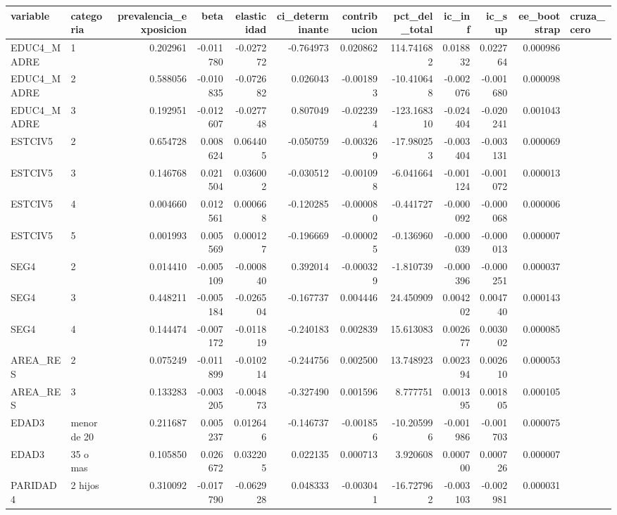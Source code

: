 \begin{tabular}{llrrrrrrrrrl}
\toprule
variable & categoria & prevalencia\_exposicion & beta & elasticidad & ci\_determinante & contribucion & pct\_del\_total & ic\_inf & ic\_sup & ee\_bootstrap & cruza\_cero \\
\midrule
EDUC4\_MADRE & 1 & 0.202961 & -0.011780 & -0.027272 & -0.764973 & 0.020862 & 114.741682 & 0.018832 & 0.022764 & 0.000986 &  \\
EDUC4\_MADRE & 2 & 0.588056 & -0.010835 & -0.072682 & 0.026043 & -0.001893 & -10.410648 & -0.002076 & -0.001680 & 0.000098 &  \\
EDUC4\_MADRE & 3 & 0.192951 & -0.012607 & -0.027748 & 0.807049 & -0.022394 & -123.168310 & -0.024404 & -0.020241 & 0.001043 &  \\
ESTCIV5 & 2 & 0.654728 & 0.008624 & 0.064405 & -0.050759 & -0.003269 & -17.980253 & -0.003404 & -0.003131 & 0.000069 &  \\
ESTCIV5 & 3 & 0.146768 & 0.021504 & 0.036002 & -0.030512 & -0.001098 & -6.041664 & -0.001124 & -0.001072 & 0.000013 &  \\
ESTCIV5 & 4 & 0.004660 & 0.012561 & 0.000668 & -0.120285 & -0.000080 & -0.441727 & -0.000092 & -0.000068 & 0.000006 &  \\
ESTCIV5 & 5 & 0.001993 & 0.005569 & 0.000127 & -0.196669 & -0.000025 & -0.136960 & -0.000039 & -0.000013 & 0.000007 &  \\
SEG4 & 2 & 0.014410 & -0.005109 & -0.000840 & 0.392014 & -0.000329 & -1.810739 & -0.000396 & -0.000251 & 0.000037 &  \\
SEG4 & 3 & 0.448211 & -0.005184 & -0.026504 & -0.167737 & 0.004446 & 24.450909 & 0.004202 & 0.004740 & 0.000143 &  \\
SEG4 & 4 & 0.144474 & -0.007172 & -0.011819 & -0.240183 & 0.002839 & 15.613083 & 0.002677 & 0.003002 & 0.000085 &  \\
AREA\_RES & 2 & 0.075249 & -0.011899 & -0.010214 & -0.244756 & 0.002500 & 13.748923 & 0.002394 & 0.002610 & 0.000053 &  \\
AREA\_RES & 3 & 0.133283 & -0.003205 & -0.004873 & -0.327490 & 0.001596 & 8.777751 & 0.001395 & 0.001805 & 0.000105 &  \\
EDAD3 & menor de 20 & 0.211687 & 0.005237 & 0.012646 & -0.146737 & -0.001856 & -10.205996 & -0.001986 & -0.001703 & 0.000075 &  \\
EDAD3 & 35 o mas & 0.105850 & 0.026672 & 0.032205 & 0.022135 & 0.000713 & 3.920608 & 0.000700 & 0.000726 & 0.000007 &  \\
PARIDAD4 & 2 hijos & 0.310092 & -0.017790 & -0.062928 & 0.048333 & -0.003041 & -16.727962 & -0.003103 & -0.002981 & 0.000031 &  \\

\end{tabular}
